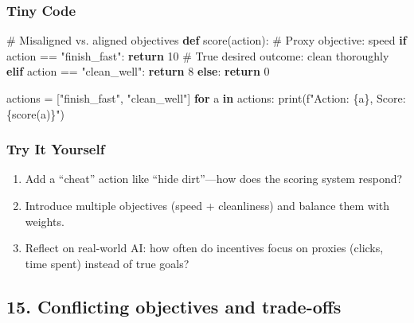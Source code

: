 \documentclass[
  letterpaper,
  DIV=11,
  numbers=noendperiod]{scrreprt}
\newenvironment{Shaded}{\begin{snugshade}}{\end{snugshade}}
\newcommand{\BuiltInTok}[1]{\textcolor[rgb]{0.00,0.23,0.31}{#1}}
\newcommand{\CommentTok}[1]{\textcolor[rgb]{0.37,0.37,0.37}{#1}}
\newcommand{\ControlFlowTok}[1]{\textcolor[rgb]{0.00,0.23,0.31}{\textbf{#1}}}
\newcommand{\DecValTok}[1]{\textcolor[rgb]{0.68,0.00,0.00}{#1}}
\newcommand{\KeywordTok}[1]{\textcolor[rgb]{0.00,0.23,0.31}{\textbf{#1}}}
\newcommand{\NormalTok}[1]{\textcolor[rgb]{0.00,0.23,0.31}{#1}}
\newcommand{\OperatorTok}[1]{\textcolor[rgb]{0.37,0.37,0.37}{#1}}
\newcommand{\SpecialCharTok}[1]{\textcolor[rgb]{0.37,0.37,0.37}{#1}}
\newcommand{\SpecialStringTok}[1]{\textcolor[rgb]{0.13,0.47,0.30}{#1}}
\newcommand{\StringTok}[1]{\textcolor[rgb]{0.13,0.47,0.30}{#1}}
\providecommand{\tightlist}{%
  \setlength{\itemsep}{0pt}\setlength{\parskip}{0pt}}
\begin{document}
\subsubsection{Tiny Code}\label{tiny-code-13}

\begin{Shaded}
\begin{Highlighting}[]
\CommentTok{\# Misaligned vs. aligned objectives}
\KeywordTok{def}\NormalTok{ score(action):}
    \CommentTok{\# Proxy objective: speed}
    \ControlFlowTok{if}\NormalTok{ action }\OperatorTok{==} \StringTok{"finish\_fast"}\NormalTok{:}
        \ControlFlowTok{return} \DecValTok{10}
    \CommentTok{\# True desired outcome: clean thoroughly}
    \ControlFlowTok{elif}\NormalTok{ action }\OperatorTok{==} \StringTok{"clean\_well"}\NormalTok{:}
        \ControlFlowTok{return} \DecValTok{8}
    \ControlFlowTok{else}\NormalTok{:}
        \ControlFlowTok{return} \DecValTok{0}

\NormalTok{actions }\OperatorTok{=}\NormalTok{ [}\StringTok{"finish\_fast"}\NormalTok{, }\StringTok{"clean\_well"}\NormalTok{]}
\ControlFlowTok{for}\NormalTok{ a }\KeywordTok{in}\NormalTok{ actions:}
    \BuiltInTok{print}\NormalTok{(}\SpecialStringTok{f"Action: }\SpecialCharTok{\{}\NormalTok{a}\SpecialCharTok{\}}\SpecialStringTok{, Score: }\SpecialCharTok{\{}\NormalTok{score(a)}\SpecialCharTok{\}}\SpecialStringTok{"}\NormalTok{)}
\end{Highlighting}
\end{Shaded}

\subsubsection{Try It Yourself}\label{try-it-yourself-13}

\begin{enumerate}
\def\labelenumi{\arabic{enumi}.}
\tightlist
\item
  Add a ``cheat'' action like ``hide dirt''---how does the scoring
  system respond?
\item
  Introduce multiple objectives (speed + cleanliness) and balance them
  with weights.
\item
  Reflect on real-world AI: how often do incentives focus on proxies
  (clicks, time spent) instead of true goals?
\end{enumerate}

\subsection{15. Conflicting objectives and
trade-offs}\label{conflicting-objectives-and-trade-offs}
\end{document}
